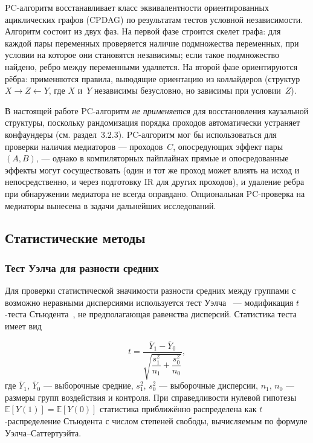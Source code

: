 PC-алгоритм восстанавливает класс эквивалентности ориентированных ациклических графов (CPDAG) по результатам тестов условной независимости. Алгоритм состоит из двух фаз. На первой фазе строится скелет графа: для каждой пары переменных проверяется наличие подмножества переменных, при условии на которое они становятся независимы; если такое подмножество найдено, ребро между переменными удаляется. На второй фазе ориентируются рёбра: применяются правила, выводящие ориентацию из коллайдеров (структур $X \to Z \leftarrow Y$, где $X$ и~$Y$ независимы безусловно, но зависимы при условии~$Z$).

В настоящей работе PC-алгоритм \emph{не применяется} для восстановления каузальной структуры, поскольку рандомизация порядка проходов автоматически устраняет конфаундеры (см. раздел~3.2.3). PC-алгоритм мог бы использоваться для проверки наличия медиаторов --- проходов~$C$, опосредующих эффект пары $(A, B)$, --- однако в компиляторных пайплайнах прямые и опосредованные эффекты могут сосуществовать (один и тот же проход может влиять на исход и непосредственно, и через подготовку IR для других проходов), и удаление ребра при обнаружении медиатора не всегда оправдано. Опциональная PC-проверка на медиаторы вынесена в задачи дальнейших исследований.

\subsection{Статистические методы}

\subsubsection{Тест Уэлча для разности средних}

Для проверки статистической значимости разности средних между группами с возможно неравными дисперсиями используется тест Уэлча~\cite{welch1947} --- модификация $t$-теста Стьюдента~\cite{student1908}, не предполагающая равенства дисперсий. Статистика теста имеет вид

\begin{equation}
    t = \frac{\bar{Y}_1 - \bar{Y}_0}{\sqrt{\dfrac{s_1^2}{n_1} + \dfrac{s_0^2}{n_0}}},
\end{equation}
где $\bar{Y}_1$, $\bar{Y}_0$ --- выборочные средние, $s_1^2$, $s_0^2$ --- выборочные дисперсии, $n_1$, $n_0$ --- размеры групп воздействия и контроля. При справедливости нулевой гипотезы $\mathbb{E}[Y(1)] = \mathbb{E}[Y(0)]$ статистика приближённо распределена как $t$-распределение Стьюдента с числом степеней свободы, вычисляемым по формуле Уэлча--Саттертуэйта.

